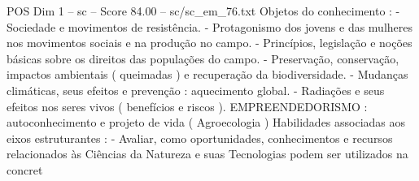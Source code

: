 \begin{textsample}{POS Dim 1 – sc – Score 84.00 – sc/sc\_em\_76.txt}
Objetos do conhecimento : - Sociedade e movimentos de resistência. - Protagonismo dos jovens e das mulheres nos movimentos sociais e na produção no campo. - Princípios, legislação e noções básicas sobre os direitos das populações do campo. - Preservação, conservação, impactos ambientais ( queimadas ) e recuperação da biodiversidade. - Mudanças climáticas, seus efeitos e prevenção : aquecimento global. - Radiações e seus efeitos nos seres vivos ( benefícios e riscos ).
EMPREENDEDORISMO : autoconhecimento e projeto de vida ( Agroecologia ) Habilidades associadas aos eixos estruturantes : - Avaliar, como oportunidades, conhecimentos e recursos relacionados às Ciências da Natureza e suas Tecnologias podem ser utilizados na concret

\end{textsample}
